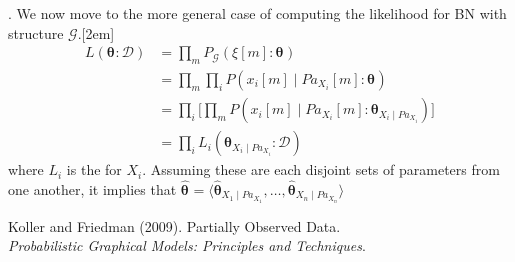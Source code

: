 \documentclass[11pt]{article}
\renewcommand\vec[2][]{\bm{#2}_{#1}}
\newcommand\myspace[1][]{\vspace{#1\bigskipamount}}
\newcommand\p{\Needspace{10\baselineskip} \noindent}
\begin{document}
\myspace
\p {}. We now move to the more general case of computing the likelihood for BN with structure $\mathcal G$.[2em]
\begin{align}
	L(\vec{\theta} : \mathcal D) &= \prod_m P_{\mathcal G} (\xi[m] : \vec{\theta}) \\
	&= \prod_m \prod_i P(x_i[m] \mid Pa_{X_i}[m] : \vec{\theta}) \\
	&= \prod_i \bigg[ \prod_m  P(x_i[m] \mid Pa_{X_i}[m] : \vec[X_i \mid Pa_{X_i}]{\theta})  \bigg] \\
	&= \prod_i L_i (\vec[X_i \mid Pa_{X_i}]{\theta} : \mathcal D)
\end{align}
where $L_i$ is the  for $X_i$. Assuming these are each disjoint sets of parameters from one another, it implies that $\hat{\vec{\theta}} = \langle \vec[X_1 \mid Pa_{X_1}]{\hat{\theta}}, \ldots, \vec[X_n \mid Pa_{X_n}]{\hat{\theta}}   \rangle$







\vspace{-1.7em}
{\scriptsize Koller and Friedman (2009). Partially Observed Data.\\ \textit{Probabilistic Graphical Models: Principles and Techniques}.\\ }
\end{document}
